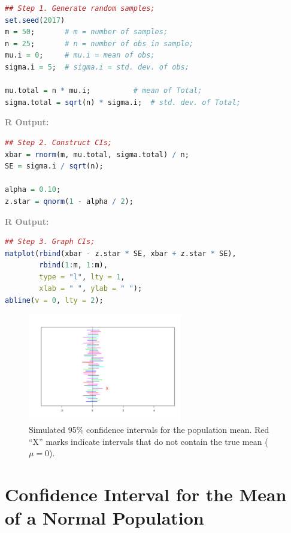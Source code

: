 \begin{lstlisting}[language=R]
## Step 1. Generate random samples;
set.seed(2017)
m = 50;       # m = number of samples;
n = 25;       # n = number of obs in sample;
mu.i = 0;     # mu.i = mean of obs;
sigma.i = 5;  # sigma.i = std. dev. of obs;

mu.total = n * mu.i;          # mean of Total;
sigma.total = sqrt(n) * sigma.i;  # std. dev. of Total;
\end{lstlisting}

\vspace{1em}
\textcolor{gray}{\textbf{R Output:}}

\begin{lstlisting}[language=R]
## Step 2. Construct CIs;
xbar = rnorm(m, mu.total, sigma.total) / n;
SE = sigma.i / sqrt(n);

alpha = 0.10;
z.star = qnorm(1 - alpha / 2);
\end{lstlisting}

\vspace{1em}
\textcolor{gray}{\textbf{R Output:}}

\begin{lstlisting}[language=R]
## Step 3. Graph CIs;
matplot(rbind(xbar - z.star * SE, xbar + z.star * SE),
        rbind(1:m, 1:m),
        type = "l", lty = 1,
        xlab = " ", ylab = " ");
abline(v = 0, lty = 2);
\end{lstlisting}

\begin{figure}[h!]
  \centering
  \includegraphics[width=0.6\textwidth]{Section6/confidence_intervals.pdf}
  \caption{Simulated 95\% confidence intervals for the population mean. Red “X” marks indicate intervals that do not contain the true mean (\( \mu = 0 \)).}
\end{figure}


\vspace{2em}

\section*{Confidence Interval for the Mean of a Normal Population}

